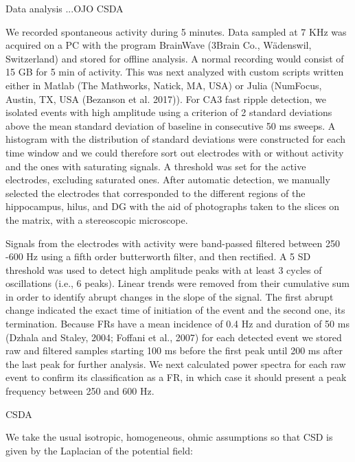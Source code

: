 Data analysis ...OJO CSDA

We recorded spontaneous activity during 5 minutes. Data sampled at 7 KHz was acquired on a PC with the program BrainWave (3Brain Co., Wädenswil, Switzerland) and stored for offline analysis. A normal recording would consist of 15 GB for 5 min of activity. This was next analyzed with custom scripts written either in Matlab (The Mathworks, Natick, MA, USA) or Julia (NumFocus, Austin, TX, USA (Bezanson et al. 2017)). For CA3 fast ripple detection, we isolated events with high amplitude using a criterion of 2 standard deviations above the mean standard deviation of baseline in consecutive 50 ms sweeps. A histogram with the distribution of standard deviations were constructed for each time window and we could therefore sort out electrodes with or without activity and the ones with saturating signals. A threshold was set for the active electrodes, excluding saturated ones. After automatic detection, we manually selected the electrodes that corresponded to the different regions of the hippocampus, hilus, and DG with the aid of photographs taken to the slices on the matrix, with a stereoscopic microscope.

            Signals from the electrodes with activity were band-passed filtered between 250 -600 Hz using a fifth order butterworth filter, and then rectified. A 5 SD threshold was used to detect high amplitude peaks with at least 3 cycles of oscillations (i.e., 6 peaks). Linear trends were removed from their cumulative sum in order to identify abrupt changes in the slope of the signal. The first abrupt change indicated the exact time of initiation of the event and the second one, its termination. Because FRs have a mean incidence of 0.4 Hz and duration of 50 ms (Dzhala and Staley, 2004; Foffani et al., 2007) for each detected event we stored raw and filtered samples starting 100 ms before the first peak until 200 ms after the last peak for further analysis. We next calculated power spectra for each raw event to confirm its classification as a FR, in which case it should present a peak frequency between 250 and 600 Hz.



            CSDA
            
            
             We take the usual isotropic, homogeneous, ohmic assumptions so that CSD is given by the Laplacian of the potential field:

